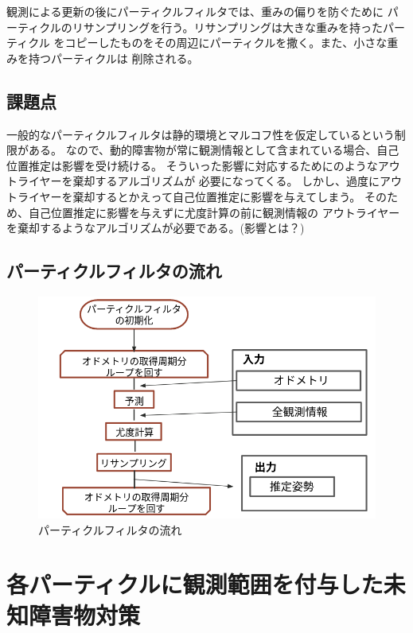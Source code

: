 観測による更新の後にパーティクルフィルタでは、重みの偏りを防ぐために
パーティクルのリサンプリングを行う。リサンプリングは大きな重みを持ったパーティクル
をコピーしたものをその周辺にパーティクルを撒く。また、小さな重みを持つパーティクルは
削除される。

\section{課題点}

一般的なパーティクルフィルタは静的環境とマルコフ性を仮定しているという制限がある。
なので、動的障害物が常に観測情報として含まれている場合、自己位置推定は影響を受け続ける。
そういった影響に対応するために\cite{赤井2019}のようなアウトライヤーを棄却するアルゴリズムが
必要になってくる。
しかし、過度にアウトライヤーを棄却するとかえって自己位置推定に影響を与えてしまう。
そのため、自己位置推定に影響を与えずに尤度計算の前に観測情報の
アウトライヤーを棄却するようなアルゴリズムが必要である。(影響とは？)

\newpage
\section{パーティクルフィルタの流れ}
\begin{figure}[h]
  \begin{center}
    \includegraphics[width=1.2\linewidth]{figs/particle_filter_flow.png}
    \caption{パーティクルフィルタの流れ}
    \label{fig:particle_filter_flow}
  \end{center}
\end{figure}

\chapter{各パーティクルに観測範囲を付与した未知障害物対策}
